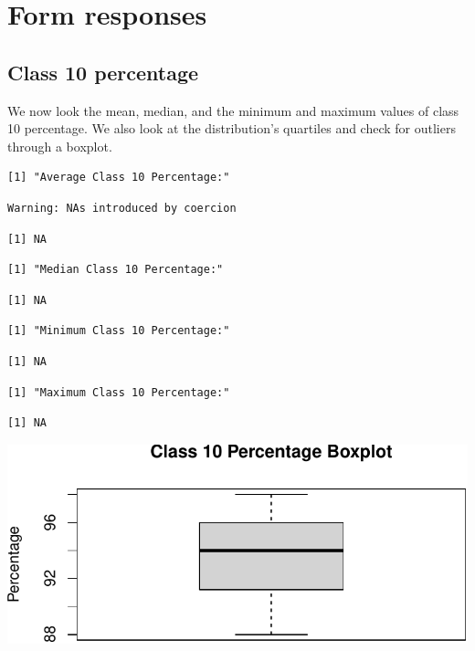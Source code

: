 \documentclass[
  letterpaper,
  DIV=11,
  numbers=noendperiod]{scrartcl}
\begin{document}
\hypertarget{form-responses}{%
\section{Form responses}\label{form-responses}}

\hypertarget{class-10-percentage}{%
\subsection{Class 10 percentage}\label{class-10-percentage}}

We now look the mean, median, and the minimum and maximum values of
class 10 percentage. We also look at the distribution's quartiles and
check for outliers through a boxplot.

\begin{verbatim}
[1] "Average Class 10 Percentage:"
\end{verbatim}

\begin{verbatim}
Warning: NAs introduced by coercion
\end{verbatim}

\begin{verbatim}
[1] NA
\end{verbatim}

\begin{verbatim}
[1] "Median Class 10 Percentage:"
\end{verbatim}

\begin{verbatim}
[1] NA
\end{verbatim}

\begin{verbatim}
[1] "Minimum Class 10 Percentage:"
\end{verbatim}

\begin{verbatim}
[1] NA
\end{verbatim}

\begin{verbatim}
[1] "Maximum Class 10 Percentage:"
\end{verbatim}

\begin{verbatim}
[1] NA
\end{verbatim}

\includegraphics{Question1_files/figure-pdf/unnamed-chunk-2-1.pdf}
\end{document}
